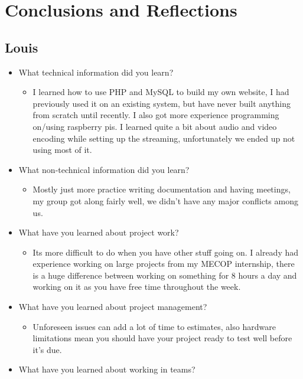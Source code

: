 \documentclass[onecolumn, draftclsnofoot,10pt, compsoc]{IEEEtran}
\begin{document}
\section{Conclusions and Reflections}

    \subsection{Louis}
    \begin{itemize}
        \item What technical information did you learn?
        \begin{itemize}
            \item I learned how to use PHP and MySQL to build my own website, I had previously used it on an existing system, but have never built anything from scratch until recently. I also got more experience programming on/using raspberry pis. I learned quite a bit about audio and video encoding while setting up the streaming, unfortunately we ended up not using most of it.
        \end{itemize}
        \item What non-technical information did you learn?
        \begin{itemize}
            \item Mostly just more practice writing documentation and having meetings, my group got along fairly well, we didn't have any major conflicts among us. 
        \end{itemize}
        \item What have you learned about project work?
        \begin{itemize}
            \item Its more difficult to do when you have other stuff going on. I already had experience working on large projects from my MECOP internship, there is a huge difference between working on something for 8 hours a day and working on it as you have free time throughout the week.
        \end{itemize}
        \item What have you learned about project management?
        \begin{itemize}
            \item Unforeseen issues can add a lot of time to estimates, also hardware limitations mean you should have your project ready to test well before it's due. 
        \end{itemize}
        \item What have you learned about working in teams?

\end{itemize}
\end{document}
